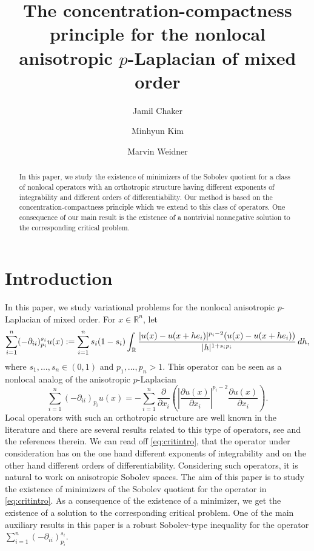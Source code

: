 \documentclass[11pt]{amsart}
\title[]{The concentration-compactness principle for the nonlocal anisotropic $p$-Laplacian of mixed order}
\author{Jamil Chaker}
\author{Minhyun Kim}
\author{Marvin Weidner}
\theoremstyle{plain}
\theoremstyle{definition}
\numberwithin{equation}{section}
\renewcommand{\d}{\textnormal{d}}
\newcommand{\R}{\mathbb{R}}
\begin{document}
\begin{abstract}
In this paper, we study the existence of minimizers of the Sobolev quotient for a class of nonlocal operators with an orthotropic structure having different exponents of integrability and different orders of differentiability. Our method is based on the concentration-compactness principle which we extend to this class of operators. One consequence of our main result is the existence of a nontrivial nonnegative solution to the corresponding critical problem.
\end{abstract}

\maketitle


\section{Introduction} \label{sec:introduction}
In this paper, we study variational problems for the nonlocal anisotropic $p$-Laplacian of mixed order. For $x\in\R^n$, let
\begin{equation}\label{eq:critintro}
\sum_{i=1}^n (-\partial_{ii})^{s_i}_{p_i} u(x) := \sum_{i=1}^n s_i(1-s_i) \int_{\mathbb{R}} \frac{|u(x)-u(x+he_i)|^{p_i-2}(u(x)-u(x+he_i))}{|h|^{1+s_ip_i}} \,\d h,
\end{equation}
where $s_1,\dots,s_n\in(0,1)$ and $p_1,\dots,p_n>1$.  
This operator can be seen as a nonlocal analog of the anisotropic $p$-Laplacian
\begin{equation}\label{eq:locaniso}
\sum_{i=1}^n (-\partial_{ii})_{p_i} u(x) = -\sum_{i=1}^n \frac{\partial}{\partial x_i} \left( \left|\frac{\partial u(x)}{\partial x_i}\right|^{p_i-2}\frac{\partial u(x)}{\partial x_i} \right).
\end{equation}
Local operators with such an orthotropic structure are well known in the literature and there are several results related to this type of operators, see \cite{Lions69,Mar89,BMS90,DC09,DCM09,FS19,BB20,CFS21,dST21,FVV21, BBLV21} and the references therein. We can read off \eqref{eq:critintro}, that the operator under consideration has on the one hand different exponents of integrability and on the other hand different orders of differentiability. Considering such operators, it is natural to work on anisotropic Sobolev spaces.
The aim of this paper is to study the existence of minimizers of the Sobolev quotient for the operator in \eqref{eq:critintro}. As a consequence of the existence of a minimizer, we get the existence of a solution to the corresponding critical problem. One of the main auxiliary results in this paper is a robust Sobolev-type inequality for the operator $\sum_{i=1}^n (-\partial_{ii})^{s_i}_{p_i}$.
\end{document}
